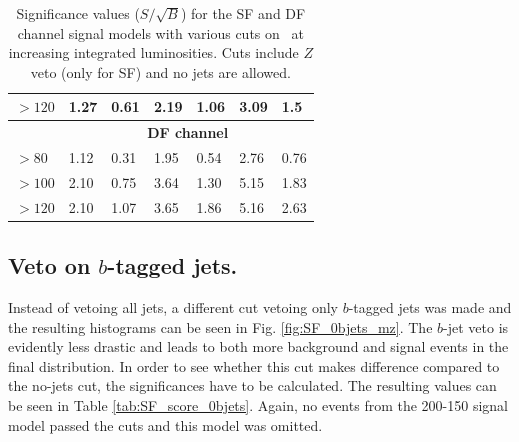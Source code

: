 \begin{table}[H]
\begin{tabular}{|l|llllll}
$>120$  & \multicolumn{1}{l|}{1.27}               & \multicolumn{1}{l|}{0.61}               & \multicolumn{1}{l|}{2.19}               & \multicolumn{1}{l|}{1.06}               & \multicolumn{1}{l|}{3.09}               & \multicolumn{1}{l|}{1.5}                \\ \hline
                  & \multicolumn{6}{c|}{\textbf{DF channel}}                                                                                                                                                                                                                  \\ \hline
$>80$   & \multicolumn{1}{l|}{1.12}               & \multicolumn{1}{l|}{0.31}               & \multicolumn{1}{l|}{1.95}               & \multicolumn{1}{l|}{0.54}               & \multicolumn{1}{l|}{2.76}               & \multicolumn{1}{l|}{0.76}               \\ \hline
$>100$   & \multicolumn{1}{l|}{2.10}               & \multicolumn{1}{l|}{0.75}               & \multicolumn{1}{l|}{3.64}               & \multicolumn{1}{l|}{1.30}               & \multicolumn{1}{l|}{5.15}               & \multicolumn{1}{l|}{1.83}               \\ \hline
$>120$    & \multicolumn{1}{l|}{2.10}               & \multicolumn{1}{l|}{1.07}               & \multicolumn{1}{l|}{3.65}               & \multicolumn{1}{l|}{1.86}               & \multicolumn{1}{l|}{5.16}               & \multicolumn{1}{l|}{2.63}               \\ \hline
\end{tabular}
\caption{Significance values ($S/\sqrt{B}$) for the SF and DF channel signal models with various cuts on \mttwo \, at increasing integrated luminosities. Cuts include $Z$ veto (only for SF) and no jets are allowed.}
\label{tab:SF_score}
\end{table}


\subsection{Veto on $b$-tagged jets.}

Instead of vetoing all jets, a different cut vetoing only $b$-tagged jets was made and the resulting histograms can be seen in Fig. \ref{fig:SF_0bjets_mz}. The $b$-jet veto is evidently less drastic and leads to both more background and signal events in the final distribution. In order to see whether this cut makes difference compared to the no-jets cut, the significances have to be calculated. The resulting values can be seen in Table \ref{tab:SF_score_0bjets}. Again, no events from the 200-150 signal model passed the cuts and this model was omitted.

